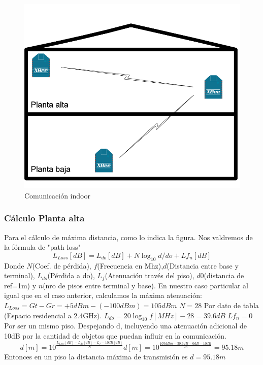 \documentclass[11pt,oneside,spanish,a4paper]{article}
\begin{document}
\begin{figure}[h]
	\centering\includegraphics[width=0.6\linewidth]{img/xbee-ejemplo.png}
	\caption{Comunicaci\'on indoor}
\end{figure}

\subsubsection{C\'alculo Planta alta}
Para el c\'alculo de m\'axima distancia, como lo indica la figura. Nos valdremos de la f\'ormula de "path loss"\cite{bilb:PathLoss}
\begin{equation*}
\label{eq:pathLoss}
L_{Loss}[dB] = L_{do}[dB] + N \log_{10}d/do + Lf_{n}[dB]
\end{equation*}
Donde $N$(Coef. de p\'erdida), $f$(Frecuencia en Mhz),$d$(Distancia entre base y terminal), $L_{do}$(P\'erdida a do), $L_{f}$(Atenuaci\'on trav\'es del piso), $d0$(distancia de ref=1m) y $n$(nro de pisos entre terminal y base).
En nuestro caso particular al igual que en el caso anterior, calculamos la m\'axima atenuaci\'on:
$L_{Loss}= Gt - Gr = +5dBm - (-100dBm) = 105dBm$
$N=28$ Por dato de tabla \cite{bilb:Tabla}(Espacio residencial a 2.4GHz).
$L_{do} = 20 \log_{10}f[MHz] - 28 = 39.6dB$
$Lf_{n} = 0$ Por ser un mismo piso.
Despejando d, incluyendo una atenuaci\'on adicional de 10dB por la cantidad de objetos que puedan influir en la comunicaci\'on.
\begin{equation*}
\label{eq:calculod}
d[m] = 10 ^{\frac{L_{Loss}[dB] - L_{do}[dB] - L_{f}-10dB[dB]}{N}} 
d[m] = 10 ^{\frac{105dBm - 39.6dB - 0dB - 10dB}{28}} = 95.18m
\end{equation*}
Entonces en un piso la distancia m\'axima de transmisi\'on es $d=95.18m$
\end{document}
